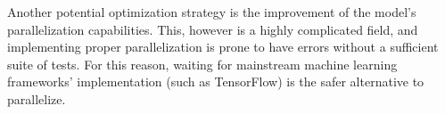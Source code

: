 \documentclass[journal]{IEEEtai}
\begin{document}
Another potential optimization strategy is the improvement of the model's parallelization capabilities. This, however is a highly complicated field, and implementing proper parallelization is prone to have errors without a sufficient suite of tests. For this reason, waiting for mainstream machine learning frameworks' implementation (such as TensorFlow\cite{tf}) is the safer alternative to parallelize.

\clearpage


\end{document}
